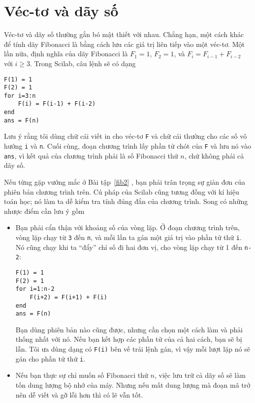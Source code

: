 \documentclass[12pt]{book}
\begin{document}
\section{Véc-tơ và dãy số}

Véc-tơ và dãy số thường gắn bó mật thiết với nhau. Chẳng hạn, một
cách khác để tính dãy Fibonacci là bằng cách lưu các giá trị liên
tiếp vào một véc-tơ. Một lần nữa, định nghĩa của dãy Fibonacci là
$F_1 = 1$, $F_2 = 1$, và $F_{i} = F_{i-1} +
F_{i-2}$ với $i \ge 3$.  Trong Scilab, câu lệnh sẽ có dạng

\begin{verbatim}
F(1) = 1
F(2) = 1
for i=3:n
    F(i) = F(i-1) + F(i-2)
end
ans = F(n)
\end{verbatim}

Lưu ý rằng tôi dùng chữ cái viết in cho véc-tơ {\tt F}
và chữ cái thường cho các số vô hướng {\tt i} và {\tt n}.
Cuối cùng, đoạn chương trình lấy phần tử chót của {\tt F} và
lưu nó vào {\tt ans}, vì kết quả của chương trình phải là
số Fibonacci thứ $n$, chứ không phải cả dãy số.

Nếu từng gặp vướng mắc ở Bài tập~\ref{fib2} , bạn phải 
trân trọng sự giản đơn của phiên bản chương trình trên. 
Cú pháp của Scilab cũng tương đồng với kí hiệu toán học; nó
làm ta dễ kiểm tra tính đúng đắn của chương trình. Song 
có những nhược điểm cần lưu ý gồm

\begin{itemize}

\item Bạn phải cẩn thận với khoảng số của vòng lặp. Ở đoạn
chương trình trên, vòng lặp chạy từ {\tt 3} đến {\tt n},
và mỗi lần ta gán một giá trị vào phần tử thứ {\tt i}.
Nó cũng chạy khi ta ``đẩy'' chỉ số đi hai đơn vị, cho
vòng lặp chạy từ 1 đến {\tt n-2}:

\begin{verbatim}
F(1) = 1
F(2) = 1
for i=1:n-2
    F(i+2) = F(i+1) + F(i)
end
ans = F(n)
\end{verbatim}

Bạn dùng phiên bản nào cũng được, nhưng cần chọn một cách
làm và phải thống nhất với nó. Nếu bạn kết hợp các phần tử
của cả hai cách, bạn sẽ bị lẫn. Tôi ưa dùng dạng có {\tt F(i)}
bên vế trái lệnh gán, vì vậy mỗi lượt lặp nó sẽ gán cho phần
tử thứ {\tt i}.

\item Nếu bạn thực sự chỉ muốn số Fibonacci thứ $n$, việc 
lưu trữ cả dãy số sẽ làm tốn dung lượng bộ nhớ của máy. Nhưng
nếu mất dung lượng mà đoạn mã trở nên dễ viết và gỡ lỗi hơn
thì có lẽ vẫn tốt.

\end{itemize}
\end{document}
